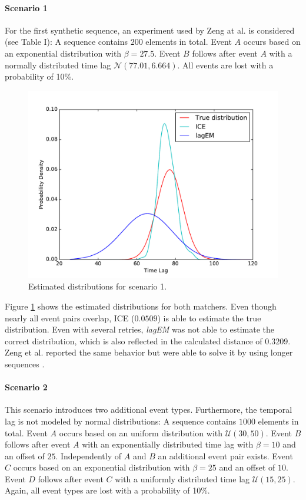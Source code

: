 \documentclass[conference]{IEEEtran}
\theoremstyle{examplestyle}
\begin{document}
\paragraph{Scenario 1}
For the first synthetic sequence, an experiment used by Zeng at al.  \cite{Zeng2015} is considered (see  Table I): A sequence contains $200$ elements in total. Event \(A\) occurs based on an exponential distribution with \(\beta = 27.5\). Event \(B\) follows after event \(A\) with a normally distributed time lag \(\mathcal{N}(77.01, 6.664)\). All events are lost with a probability of 10\%.


\begin{figure}[!tb]
	\centering
	\includegraphics[scale=0.4]{images/scenarios/1.pdf}
	\caption{Estimated distributions for scenario 1.}
	\label{fig:scen1}
\end{figure}

Figure \ref{fig:scen1} shows the estimated distributions for both matchers. Even though nearly all event pairs overlap, \ac{ICE} ($0.0509$) is able to estimate the true distribution. Even with several retries, \textit{lagEM} was not able to estimate the correct distribution, which is also reflected in the calculated distance of $0.3209$. Zeng et al. reported the same behavior but were able to solve it by using longer sequences \cite{Zeng2015}.



\paragraph{Scenario 2}
This scenario introduces two additional event types. Furthermore, the temporal lag is not modeled by normal distributions: A sequence contains $1000$ elements in total. Event \(A\) occurs based on an uniform distribution with \(\mathcal{U}(30, 50)\). Event \(B\) follows after event \(A\) with an exponentially distributed time lag with \(\beta = 10\) and an offset of $25$. Independently of \(A\) and \(B\) an additional event pair exists. Event \(C\) occurs based on an exponential distribution with \(\beta = 25\) and an offset of $10$. Event \(D\) follows after event \(C\) with a uniformly distributed time lag \(\mathcal{U}(15, 25)\). Again, all event types are lost with a probability of 10\%.
\end{document}
